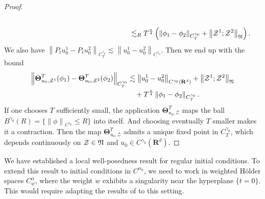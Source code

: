 \documentclass[11pt]{preprint}
\newcommand{\mcI}{\mathcal{I}}
\newcommand{\mcD}{\mathcal{D}}
\newcommand{\mcZ}{\mathcal{Z}}
\newcommand{\bfR}{\mathbf{R}}
\newcommand{\norme}[1]{\left\lVert #1 \right\lVert}
\begin{document}
\begin{proof}
\begin{align*}
	\\
	&\hspace{6cm}\lesssim_R  	T^{\frac{\kappa}{4}}  \left( \norme{\phi_1-\phi_2}_{C_T^{\gamma_0}}  +    \norme{\mcZ^1;\mcZ^2}_{\frak N}      \right).
\end{align*}
We also have $\norme{P_tu_0^1-P_tu_0^2}_{C^{\gamma_0}_T} \lesssim \norme{u_0^1-u_0^2}_{C^{\gamma_0}} $. Then we end up with the bound
			\begin{equation*}\begin{split}
					\norme{\boldsymbol{\Theta}_{u_0,\mcZ^1}^T(\phi_1) -\boldsymbol{\Theta}_{u_0,\mcZ^2}^T(\phi_2)}_{C^{\gamma_0}_T} 
					&\lesssim \norme{u_0^1-u_0^2}_{C^{\gamma_0}(\bfR^d)}  + \norme{\mcZ^1;\mcZ^2}_{\frak N} 
					\\
					&  \quad+ T^{\frac{\kappa}{4}}\norme{\phi_1-\phi_2}_{C^{\gamma_0}_T}  .
			\end{split}\end{equation*}
			If one chooses $T$ sufficiently small, the application $\boldsymbol{\Theta}_{u_0,\mcZ}^T$ maps the ball $B^{\gamma_0}(R)=\{ \norme{\phi}_{C^{\gamma_0}}\leq R \}$ into itself. And choosing eventually $T$ smaller makes it a contraction. Then the map $\boldsymbol{\Theta}_{u_0,\mcZ}^T$ admits a unique fixed point in $C^{\gamma_0}_T$, which depends continuously on $\mcZ\in\frak{N}$  and $u_0\in C^{\gamma_0}(\bfR^d)$. 
			
		\end{proof}
		
		
		
		
		
		
		\begin{remark}
			We have established a local well-posedness result for regular initial conditions. To extend this result to initial conditions in $C^{\alpha_0}$, we need to work in weighted Hölder spaces $C^\alpha_w$, where the weight $w$ exhibits a singularity near the hyperplane $\{t = 0\}$. This would require adapting the results of \cite{LocalExpansionsParacSystems} to this setting.
		\end{remark}

		
		
		
		
		
		
		
		
		
		
		
		
		
		
		
		
		
		
		
\end{document}
